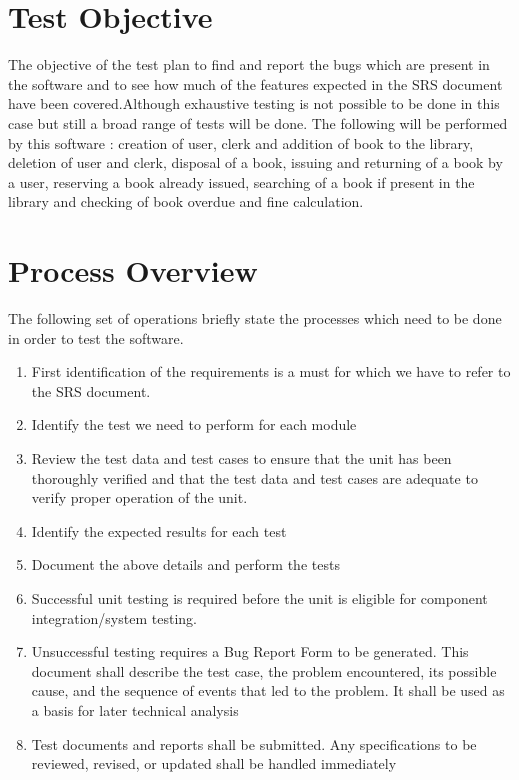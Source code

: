 \documentclass{article}
\begin{document}
\section{Test Objective}
The objective of the test plan to find and report the bugs which are present in the software and to see how much of the features expected in the SRS document have been covered.Although exhaustive testing is not possible to be done in this case but still a broad range of tests will be done. The following will be performed by this software : creation of user, clerk and addition of book to the library, deletion of user and clerk, disposal of a book, issuing and returning of a book by a user, reserving a book already issued, searching of a book if present in the library and checking of book overdue and fine calculation.

\section{Process Overview}
The following set of operations briefly state the processes which need to be done in order to test the software.
\\
\begin{enumerate}
	\item First identification of the requirements is a must for which we have to refer to the SRS document.
	\item Identify the test we need to perform for each module
	\item Review the test data and test cases to ensure that the unit has been thoroughly verified and that the
	test data and test cases are adequate to verify proper operation of the unit.
	\item Identify the expected results for each test
	\item Document the above details and perform the tests
	\item Successful unit testing is required before the unit is eligible for component integration/system
	testing. 
	\item Unsuccessful testing requires a Bug Report Form to be generated. This document shall describe the
	test case, the problem encountered, its possible cause, and the sequence of events that led to the
	problem. It shall be used as a basis for later technical analysis
	\item Test documents and reports shall be submitted. Any specifications to be reviewed, revised, or
	updated shall be handled immediately
\end{enumerate}
\end{document}
